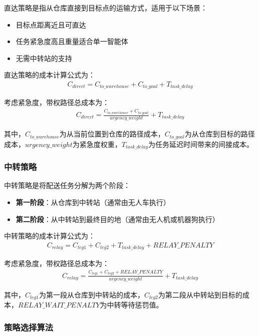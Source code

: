 \documentclass[12pt,a4paper]{article}
\begin{document}
直达策略是指从仓库直接到目标点的运输方式，适用于以下场景：
\begin{itemize}
    \item 目标点距离近且可直达
    \item 任务紧急度高且重量适合单一智能体
    \item 无需中转站的支持
\end{itemize}

直达策略的成本计算公式为：
\begin{align}
C_{direct} = C_{to\_warehouse} + C_{to\_goal} + T_{task\_delay}
\end{align}

考虑紧急度，带权路径总成本为：
\begin{align}
C_{direct} = \frac{C_{to\_warehouse} + C_{to\_goal} }{urgency\_weight}+ T_{task\_delay}
\end{align}

其中，$C_{to\_warehouse}$为从当前位置到仓库的路径成本，$C_{to\_goal}$为从仓库到目标的路径成本，$urgency\_weight$为紧急度权重，$T_{task\_delay}$为任务延迟时间带来的间接成本。

\subsubsection{中转策略}

中转策略是将配送任务分解为两个阶段：
\begin{itemize}
    \item \textbf{第一阶段}：从仓库到中转站（通常由无人车执行）
    \item \textbf{第二阶段}：从中转站到最终目的地（通常由无人机或机器狗执行）
\end{itemize}

中转策略的成本计算公式为：
\begin{align}
C_{relay} = C_{leg1} + C_{leg2}+ T_{task\_delay} + {RELAY\_PENALTY} 
\end{align}

考虑紧急度，带权路径总成本为：
\begin{align}
C_{relay} = \frac{C_{leg1} + C_{leg2}+ {RELAY\_PENALTY}}{urgency\_weight} + T_{task\_delay}  
\end{align}

其中，$C_{leg1}$为第一段从仓库到中转站的成本，$C_{leg2}$为第二段从中转站到目标的成本，$RELAY\_WAIT\_PENALTY$为中转等待惩罚值。

\subsubsection{策略选择算法}
\end{document}
